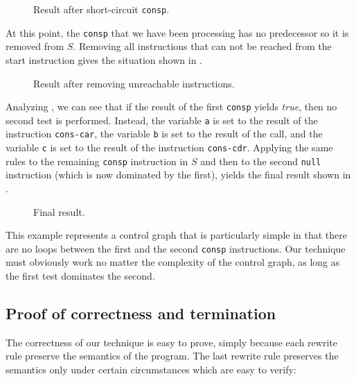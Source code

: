 \begin{figure}
\begin{center}
\end{center}
\caption{\label{fig-rewrite-6}
Result after short-circuit \texttt{consp}.}
\end{figure}

At this point, the \texttt{consp} that we have been processing has no
predecessor so it is removed from $S$.  Removing all instructions that
can not be reached from the start instruction gives the situation
shown in .

\begin{figure}
\begin{center}
\end{center}
\caption{\label{fig-rewrite-7}
Result after removing unreachable instructions.}
\end{figure}

Analyzing , we can see that if the result of the
first \texttt{consp} yields \emph{true}, then no second test is
performed.  Instead, the variable \texttt{a} is set to the result of
the instruction \texttt{cons-car}, the variable \texttt{b} is set to
the result of the call, and the variable \texttt{c} is set to the
result of the instruction \texttt{cons-cdr}.  Applying the same rules
to the remaining \texttt{consp} instruction in $S$ and then to the
second \texttt{null} instruction (which is now dominated by the
first), yields the final result shown in  .

\begin{figure}
\begin{center}
\end{center}
\caption{\label{fig-rewrite-8}
Final result.}
\end{figure}

This example represents a control graph that is particularly simple in
that there are no loops between the first and the second
\texttt{consp} instructions.  Our technique must obviously work no
matter the complexity of the control graph, as long as the first test
dominates the second.

\subsection{Proof of correctness and termination}

The correctness of our technique is easy to prove, simply because each
rewrite rule preserve the semantics of the program.  The last rewrite
rule preserves the semantics only under certain circumstances which
are easy to verify:

